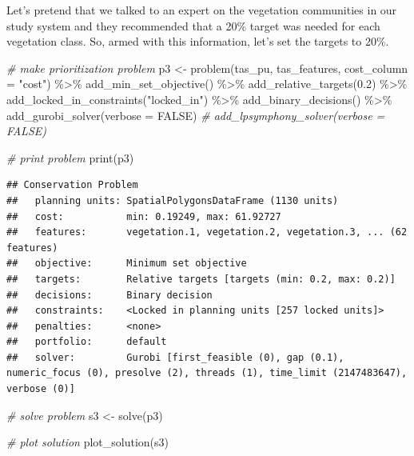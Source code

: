 \documentclass[
  12pt,
]{book}
\newenvironment{Shaded}{\begin{snugshade}}{\end{snugshade}}
\newcommand{\AttributeTok}[1]{\textcolor[rgb]{0.77,0.63,0.00}{#1}}
\newcommand{\CommentTok}[1]{\textcolor[rgb]{0.56,0.35,0.01}{\textit{#1}}}
\newcommand{\ConstantTok}[1]{\textcolor[rgb]{0.00,0.00,0.00}{#1}}
\newcommand{\FloatTok}[1]{\textcolor[rgb]{0.00,0.00,0.81}{#1}}
\newcommand{\FunctionTok}[1]{\textcolor[rgb]{0.00,0.00,0.00}{#1}}
\newcommand{\NormalTok}[1]{#1}
\newcommand{\OtherTok}[1]{\textcolor[rgb]{0.56,0.35,0.01}{#1}}
\newcommand{\SpecialCharTok}[1]{\textcolor[rgb]{0.00,0.00,0.00}{#1}}
\newcommand{\StringTok}[1]{\textcolor[rgb]{0.31,0.60,0.02}{#1}}
\begin{document}
Let's pretend that we talked to an expert on the vegetation communities in our study system and they recommended that a 20\% target was needed for each vegetation class. So, armed with this information, let's set the targets to 20\%.

\begin{Shaded}
\begin{Highlighting}[]
\CommentTok{\# make prioritization problem}
\NormalTok{p3 }\OtherTok{\textless{}{-}} \FunctionTok{problem}\NormalTok{(tas\_pu, tas\_features, }\AttributeTok{cost\_column =} \StringTok{"cost"}\NormalTok{) }\SpecialCharTok{\%\textgreater{}\%}
      \FunctionTok{add\_min\_set\_objective}\NormalTok{() }\SpecialCharTok{\%\textgreater{}\%}
      \FunctionTok{add\_relative\_targets}\NormalTok{(}\FloatTok{0.2}\NormalTok{) }\SpecialCharTok{\%\textgreater{}\%}
      \FunctionTok{add\_locked\_in\_constraints}\NormalTok{(}\StringTok{"locked\_in"}\NormalTok{) }\SpecialCharTok{\%\textgreater{}\%}
      \FunctionTok{add\_binary\_decisions}\NormalTok{() }\SpecialCharTok{\%\textgreater{}\%}
      \FunctionTok{add\_gurobi\_solver}\NormalTok{(}\AttributeTok{verbose =} \ConstantTok{FALSE}\NormalTok{)}
      \CommentTok{\# add\_lpsymphony\_solver(verbose = FALSE)}

\CommentTok{\# print problem}
\FunctionTok{print}\NormalTok{(p3)}
\end{Highlighting}
\end{Shaded}

\begin{verbatim}
## Conservation Problem
##   planning units: SpatialPolygonsDataFrame (1130 units)
##   cost:           min: 0.19249, max: 61.92727
##   features:       vegetation.1, vegetation.2, vegetation.3, ... (62 features)
##   objective:      Minimum set objective 
##   targets:        Relative targets [targets (min: 0.2, max: 0.2)]
##   decisions:      Binary decision 
##   constraints:    <Locked in planning units [257 locked units]>
##   penalties:      <none>
##   portfolio:      default
##   solver:         Gurobi [first_feasible (0), gap (0.1), numeric_focus (0), presolve (2), threads (1), time_limit (2147483647), verbose (0)]
\end{verbatim}

\begin{Shaded}
\begin{Highlighting}[]
\CommentTok{\# solve problem}
\NormalTok{s3 }\OtherTok{\textless{}{-}} \FunctionTok{solve}\NormalTok{(p3)}

\CommentTok{\# plot solution}
\FunctionTok{plot\_solution}\NormalTok{(s3)}
\end{Highlighting}
\end{Shaded}
\end{document}
